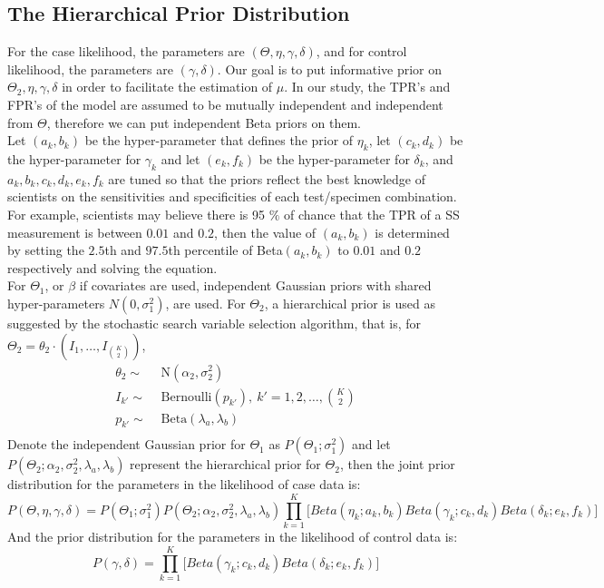 \documentclass[11 pt, a4paper]{article}  %
\begin{document}
\subsection{The Hierarchical Prior Distribution}
For the case likelihood, the parameters are $(\Theta, \eta, \gamma, \delta)$, and for control likelihood, the parameters are $(\gamma, \delta)$. Our goal is to put informative prior on $\Theta_2, \eta, \gamma, \delta$ in order to facilitate the estimation of $\mu$. In our study, the TPR's and FPR's of the model are assumed to be mutually independent and independent from $\Theta$, therefore we can put independent Beta priors on them. \\

Let $(a_k,b_k)$ be the hyper-parameter that defines the prior of $\eta_k$, let $(c_k,d_k)$ be the hyper-parameter for $\gamma_k$ and let $(e_k,f_k)$ be the hyper-parameter for $\delta_k$, and  $a_k,b_k,c_k,d_k,e_k,f_k$ are tuned so that the priors reflect the best knowledge of scientists on the sensitivities and specificities of each test/specimen combination. For example, scientists may believe there is 95 $\%$ of chance that the TPR of a SS measurement is between $0.01$ and $0.2$, then the value of $(a_k,b_k)$ is determined by setting the $2.5$th and $97.5$th percentile of Beta$(a_k,b_k)$ to $0.01$ and $0.2$ respectively and solving the equation.\\

For $\Theta_1$, or {\boldmath$\beta$} if covariates are used, independent Gaussian priors with shared hyper-parameters $N(0, \sigma_1^2)$, are used. For $\Theta_2$, a hierarchical prior is used as suggested by the stochastic search variable selection algorithm, that is, for $\Theta_2 = \theta_2 \cdot (I_1, \ldots, I_{{K \choose 2}})$,
\begin{align*}
\theta_2 \sim & \text{ N}(\alpha_2, \sigma_2^2) \\
I_{k'} \sim & \text{ Bernoulli}(p_{k'}), \ k' = 1, 2, \ldots, {K \choose 2} \\
p_{k'} \sim & \text{ Beta}(\lambda_a, \lambda_b) \\
\end{align*}
Denote the independent Gaussian prior for $\Theta_1$ as $P(\Theta_1; \sigma_1^2)$ and let $P(\Theta_2; \alpha_2, \sigma_2^2, \lambda_a, \lambda_b)$ represent the hierarchical prior for $\Theta_2$, then the joint prior distribution for the parameters in the likelihood of case data is:
\[P(\Theta, \eta, \gamma, \delta) = P(\Theta_1; \sigma_1^2) P(\Theta_2; \alpha_2, \sigma_2^2, \lambda_a, \lambda_b) \prod_{k=1}^K \Big [Beta(\eta_k; a_k,b_k) Beta(\gamma_k;c_k,d_k) Beta(\delta_k;e_k,f_k) \Big ]\]
And the prior distribution for the parameters in the likelihood of control data is:
\[P( \gamma, \delta) = \prod_{k=1}^K \Big [Beta(\gamma_k; c_k,d_k ) Beta(\delta_k; e_k,f_k) \Big] \]
\end{document}
